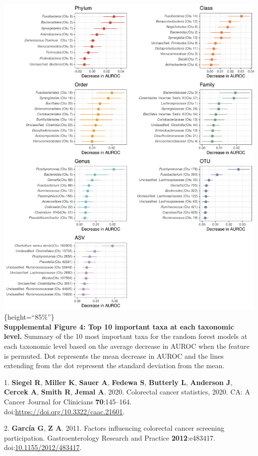 \documentclass[]{article}
\begin{document}
\includegraphics{figure_s4.png}\{height=``85\%''\}\\\textbf{Supplemental
Figure 4: Top 10 important taxa at each taxonomic level.} Summary of the
10 most important taxa for the random forest models at each taxonomic
level based on the average decrease in AUROC when the feature is
permuted. Dot represents the mean decrease in AUROC and the lines
extending from the dot represent the standard deviation from the mean.

1. \textbf{{Siegel} R}, \textbf{{Miller} K}, \textbf{{Sauer} A},
\textbf{{Fedewa} S}, \textbf{{Butterly} L}, \textbf{{Anderson} J},
\textbf{{Cercek} A}, \textbf{{Smith} R}, \textbf{{Jemal} A}. 2020.
Colorectal cancer statistics, 2020. CA: A Cancer Journal for Clinicians
\textbf{70}:145--164.
doi:\href{http://dx.doi.org/https://doi.org/10.3322/caac.21601}{https://doi.org/10.3322/caac.21601}.

2. \textbf{{García} G}, \textbf{{Z} A}. 2011. Factors influencing
colorectal cancer screening participation. Gastroenterology Research and
Practice \textbf{2012}:e483417.
doi:\href{http://dx.doi.org/10.1155/2012/483417}{10.1155/2012/483417}.
\end{document}
